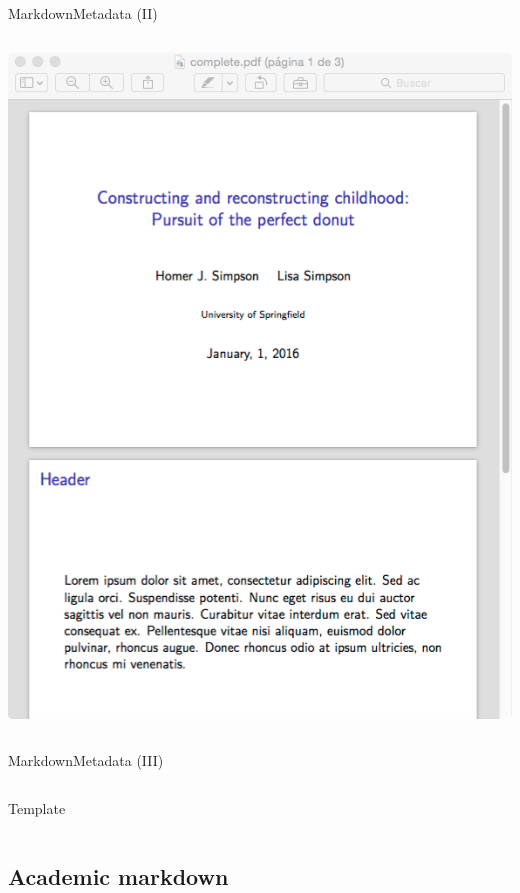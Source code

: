 \documentclass{beamer}
\begin{document}
\begin{frame}{Markdown}{Metadata (II)}
\begin{columns}
     \column{0.31\dimexpr\paperwidth-10pt}
		\centering \includegraphics[width=\linewidth]{figs/metadataBeamer.png} 
\end{columns}
\end{frame}


\begin{frame}[fragile]{Markdown}{Metadata (III)}
 \begin{columns}
	\begin{exampleblock}{Template}
	
	\end{exampleblock}
 \end{columns}
\end{frame}


\subsection{Academic markdown}
\end{document}
